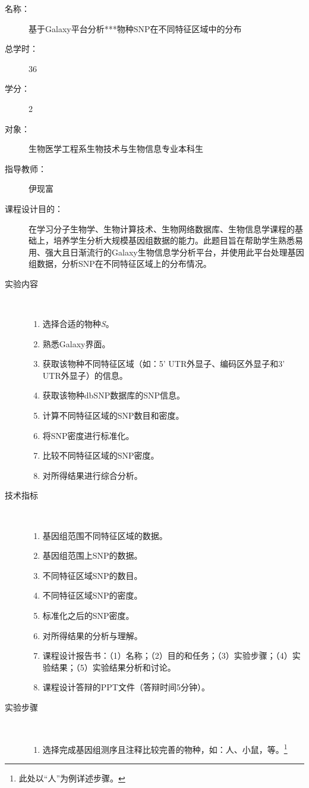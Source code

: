 \newpage
\begin{description}
	\item[名称：] 基于Galaxy平台分析***物种SNP在不同特征区域中的分布
	\item[总学时：] 36
	\item[学分：] 2
	\item[对象：] 生物医学工程系生物技术与生物信息专业本科生
	\item[指导教师：] 伊现富
	\item[课程设计目的：] 在学习分子生物学、生物计算技术、生物网络数据库、生物信息学课程的基础上，培养学生分析大规模基因组数据的能力。此题目旨在帮助学生熟悉易用、强大且日渐流行的Galaxy生物信息学分析平台，并使用此平台处理基因组数据，分析SNP在不同特征区域上的分布情况。
	\item[实验内容] \
		\begin{enumerate}
			\item 选择合适的物种\textit{S}。
			\item 熟悉Galaxy界面。
			\item 获取该物种不同特征区域（如：5' UTR外显子、编码区外显子和3' UTR外显子）的信息。
			\item 获取该物种dbSNP数据库的SNP信息。
			\item 计算不同特征区域的SNP数目和密度。
			\item 将SNP密度进行标准化。
			\item 比较不同特征区域的SNP密度。
			\item 对所得结果进行综合分析。
		\end{enumerate}
	\item[技术指标] \
		\begin{enumerate}
			\item 基因组范围不同特征区域的数据。
			\item 基因组范围上SNP的数据。
			\item 不同特征区域SNP的数目。
			\item 不同特征区域SNP的密度。
			\item 标准化之后的SNP密度。
			\item 对所得结果的分析与理解。
			\item 课程设计报告书：（1）名称；（2）目的和任务；（3）实验步骤；（4）实验结果；（5）实验结果分析和讨论。
			\item 课程设计答辩的PPT文件（答辩时间5分钟）。
		\end{enumerate}
	\item[实验步骤] \ 
		\begin{enumerate}
			\item 选择完成基因组测序且注释比较完善的物种，如：人、小鼠，等。\footnote{此处以“人”为例详述步骤。}

\end{enumerate}
\end{description}
